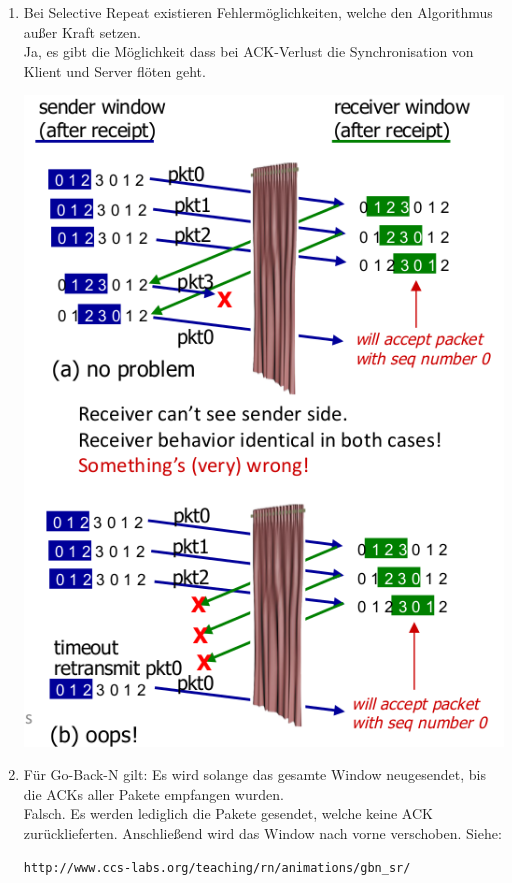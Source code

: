 \documentclass{article}
\begin{document}
\begin{enumerate}
        \item Bei Selective Repeat existieren Fehlermöglichkeiten, welche den Algorithmus außer Kraft setzen.\\
        Ja, es gibt die Möglichkeit dass bei ACK-Verlust die Synchronisation von Klient und Server flöten geht.
        \begin{center}
            \includegraphics[width=\textwidth]{SelectiveRepeat_Error.png}
        \end{center}
        
        \item Für Go-Back-N gilt: Es wird solange das gesamte Window neugesendet, bis die ACKs aller Pakete empfangen wurden.\\
        Falsch. Es werden lediglich die Pakete gesendet, welche keine ACK zurücklieferten. Anschließend wird das Window nach vorne verschoben.
        Siehe: 
        \begin{verbatim}
http://www.ccs-labs.org/teaching/rn/animations/gbn_sr/
        \end{verbatim}
        

\end{enumerate}
\end{document}
